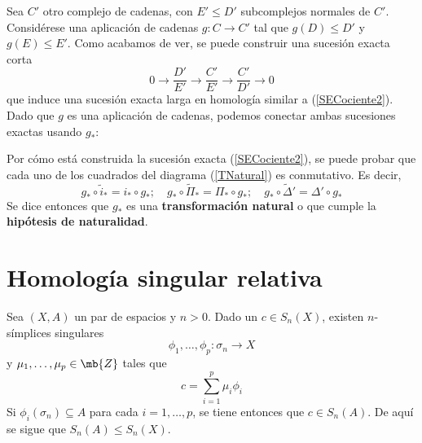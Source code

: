 Sea $C'$ otro complejo de cadenas, con $E'\leq D'$ subcomplejos normales de $C'$. Considérese una aplicación de cadenas $g: C \longrightarrow C'$ tal que $g(D) \leq D'$ y $g(E) \leq E'$. Como acabamos de ver, se puede construir una sucesión exacta corta $$0 \longrightarrow \frac{D'}{E'} \longrightarrow \frac{C'}{E'} \longrightarrow \frac{C'}{D'} \longrightarrow 0$$ que induce una sucesión exacta larga en homología similar a (\ref{SECociente2}). Dado que $g$ es una aplicación de cadenas, podemos conectar ambas sucesiones exactas usando $g_*$: 

Por cómo está construida la sucesión exacta (\ref{SECociente2}), se puede probar que cada uno de los cuadrados del diagrama (\ref{TNatural}) es conmutativo. Es decir, $$g_*\circ \tilde{i}_*=i_*\circ g_*; \quad g_*\circ \tilde{\Pi}_*=\Pi_*\circ g_*; \quad g_*\circ \tilde{\Delta}'=\Delta'\circ g_*$$ Se dice entonces que $g_*$ es una \textbf{transformación natural} o que cumple la \textbf{hipótesis de naturalidad}.
\\

\section{Homología singular relativa}

Sea $(X,A)$ un par de espacios y $n > 0$. Dado un $c \in S_n(X)$, existen $n$-símplices singulares $$\phi_1,\dots,\phi_p: \sigma_n \longrightarrow X$$ y $\mu_1,\dots,\mu_p \in \mb{Z}$ tales que $$c=\sum^p_{i=1}\mu_i\phi_i$$ Si $\phi_i(\sigma_n) \subseteq A$ para cada $i=1,\dots,p$, se tiene entonces que $c \in S_n(A)$. De aquí se sigue que $S_n(A) \leq S_n(X)$.
\\

